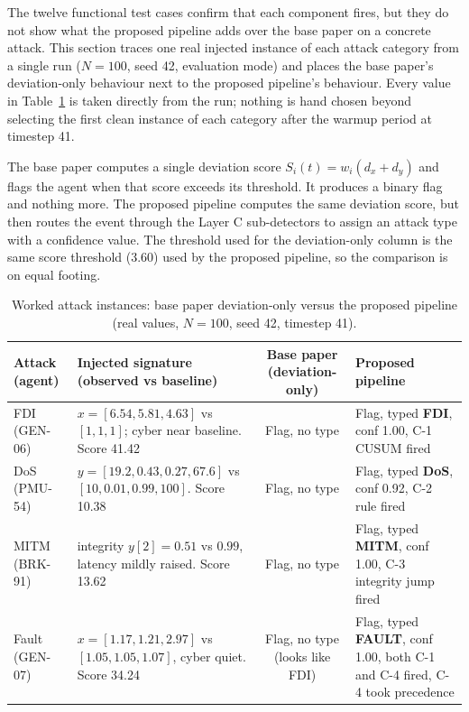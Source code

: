The twelve functional test cases confirm that each component fires, but they do not show what the proposed pipeline adds over the base paper on a concrete attack. This section traces one real injected instance of each attack category from a single run ($N=100$, seed 42, evaluation mode) and places the base paper's deviation-only behaviour next to the proposed pipeline's behaviour. Every value in Table~\ref{tab:worked_attack} is taken directly from the run; nothing is hand chosen beyond selecting the first clean instance of each category after the warmup period at timestep 41.

\par \vspace{0.25cm}
\noindent
The base paper computes a single deviation score $S_i(t) = w_i(d_x + d_y)$ and flags the agent when that score exceeds its threshold. It produces a binary flag and nothing more. The proposed pipeline computes the same deviation score, but then routes the event through the Layer C sub-detectors to assign an attack type with a confidence value. The threshold used for the deviation-only column is the same score threshold (3.60) used by the proposed pipeline, so the comparison is on equal footing.

\begin{table}[H]
\centering
\caption{Worked attack instances: base paper deviation-only versus the proposed pipeline (real values, $N=100$, seed 42, timestep 41).}
\label{tab:worked_attack}
\begin{tabular}{|l|p{3.6cm}|c|p{3.8cm}|}
\hline
\textbf{Attack (agent)} & \textbf{Injected signature (observed vs baseline)} & \textbf{Base paper (deviation-only)} & \textbf{Proposed pipeline} \\ \hline
FDI (GEN-06) & $x = [6.54, 5.81, 4.63]$ vs $[1,1,1]$; cyber near baseline. Score 41.42 & Flag, no type & Flag, typed \textbf{FDI}, conf 1.00, C-1 CUSUM fired \\ \hline
DoS (PMU-54) & $y = [19.2, 0.43, 0.27, 67.6]$ vs $[10, 0.01, 0.99, 100]$. Score 10.38 & Flag, no type & Flag, typed \textbf{DoS}, conf 0.92, C-2 rule fired \\ \hline
MITM (BRK-91) & integrity $y[2] = 0.51$ vs $0.99$, latency mildly raised. Score 13.62 & Flag, no type & Flag, typed \textbf{MITM}, conf 1.00, C-3 integrity jump fired \\ \hline
Fault (GEN-07) & $x = [1.17, 1.21, 2.97]$ vs $[1.05, 1.05, 1.07]$, cyber quiet. Score 34.24 & Flag, no type (looks like FDI) & Flag, typed \textbf{FAULT}, conf 1.00, both C-1 and C-4 fired, C-4 took precedence \\ \hline
\end{tabular}
\end{table}

